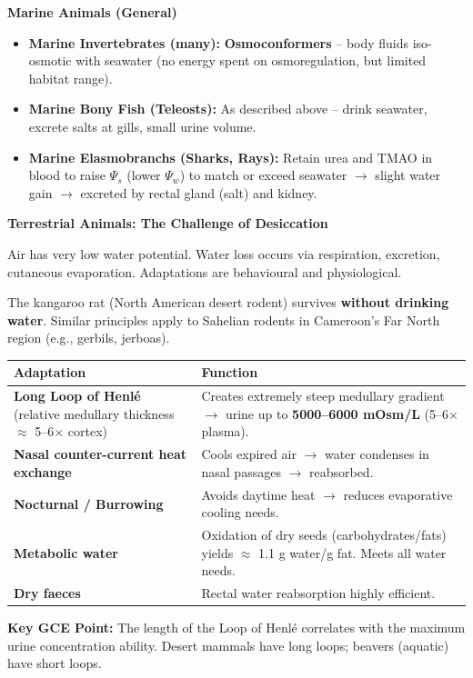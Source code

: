 \documentclass[11pt]{article}
\begin{document}
\textbf{Marine Animals (General)}\par
\begin{itemize}
    \item \textbf{Marine Invertebrates (many):} \textbf{Osmoconformers} -- body fluids iso-osmotic with seawater (no energy spent on osmoregulation, but limited habitat range).
    \item \textbf{Marine Bony Fish (Teleosts):} As described above -- drink seawater, excrete salts at gills, small urine volume.
    \item \textbf{Marine Elasmobranchs (Sharks, Rays):} Retain urea and TMAO in blood to raise $\Psi_s$ (lower $\Psi_w$) to match or exceed seawater $\rightarrow$ slight water gain $\rightarrow$ excreted by rectal gland (salt) and kidney.
\end{itemize}

\textbf{Terrestrial Animals: The Challenge of Desiccation}\par
Air has very low water potential. Water loss occurs via respiration, excretion, cutaneous evaporation. Adaptations are behavioural and physiological.

\begin{experience}
The kangaroo rat (North American desert rodent) survives \textbf{without drinking water}. Similar principles apply to Sahelian rodents in Cameroon's Far North region (e.g., gerbils, jerboas).
\begin{center}
\begin{tabularx}{\linewidth}{|l|X|}\hline
\textbf{Adaptation} & \textbf{Function} \\\hline
\textbf{Long Loop of Henlé} (relative medullary thickness $\approx$ 5--6$\times$ cortex) & Creates extremely steep medullary gradient $\rightarrow$ urine up to \textbf{5000--6000 mOsm/L} (5--6$\times$ plasma). \\\hline
\textbf{Nasal counter-current heat exchange} & Cools expired air $\rightarrow$ water condenses in nasal passages $\rightarrow$ reabsorbed. \\\hline
\textbf{Nocturnal / Burrowing} & Avoids daytime heat $\rightarrow$ reduces evaporative cooling needs. \\\hline
\textbf{Metabolic water} & Oxidation of dry seeds (carbohydrates/fats) yields $\approx$ 1.1 g water/g fat. Meets all water needs. \\\hline
\textbf{Dry faeces} & Rectal water reabsorption highly efficient. \\\hline
\end{tabularx}
\end{center}
\textbf{Key GCE Point:} The length of the Loop of Henlé correlates with the maximum urine concentration ability. Desert mammals have long loops; beavers (aquatic) have short loops.
\end{experience}
\end{document}
